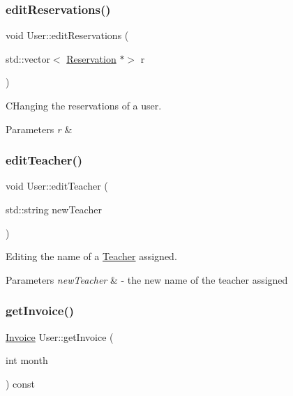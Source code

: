 \subsubsection{\texorpdfstring{edit\+Reservations()}{editReservations()}}
{\footnotesize\ttfamily void User\+::edit\+Reservations (\begin{DoxyParamCaption}\item[{std\+::vector$<$ \mbox{\hyperlink{class_reservation}{Reservation}} $\ast$$>$}]{r }\end{DoxyParamCaption})}



C\+Hanging the reservations of a user. 


\begin{DoxyParams}{Parameters}
{\em r} & \\
\hline
\end{DoxyParams}
\mbox{\label{class_user_a3161559f3e7b4c29b8a60a51f3d002ad}} 
\subsubsection{\texorpdfstring{edit\+Teacher()}{editTeacher()}}
{\footnotesize\ttfamily void User\+::edit\+Teacher (\begin{DoxyParamCaption}\item[{std\+::string}]{new\+Teacher }\end{DoxyParamCaption})}



Editing the name of a \mbox{\hyperlink{class_teacher}{Teacher}} assigned. 


\begin{DoxyParams}{Parameters}
{\em new\+Teacher} & -\/ the new name of the teacher assigned \\
\hline
\end{DoxyParams}
\mbox{\label{class_user_a82cb8a4c8f92d2a31fb2e8b0cff001f6}} 
\subsubsection{\texorpdfstring{get\+Invoice()}{getInvoice()}}
{\footnotesize\ttfamily \mbox{\hyperlink{class_invoice}{Invoice}} User\+::get\+Invoice (\begin{DoxyParamCaption}\item[{int}]{month }\end{DoxyParamCaption}) const}

